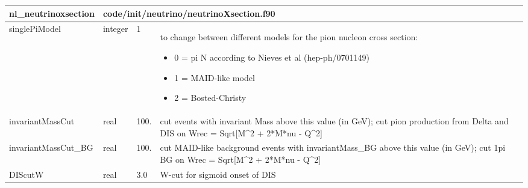\documentclass{article}
\begin{document}
\begin{longtable}{llll}
\toprule
\textbf{\large{nl\_neutrinoxsection}} & \multicolumn{3}{l}{\footnotesize{code/init/neutrino/neutrinoXsection.f90}}\\*
\midrule
\endfirsthead
\midrule
\endhead
singlePiModel & \begin{minipage}[t]{2cm}integer\end{minipage} & \begin{minipage}[t]{2cm}1\end{minipage} & \begin{minipage}[t]{12cm}to change between different models for the pion nucleon cross section:\begin{itemize}\leftmargin0em\itemindent0pt\item 0 = pi N according to Nieves et al (hep-ph/0701149)\item 1 = MAID-like model\item 2 = Bosted-Christy\end{itemize}\end{minipage}\\*
\midrule
invariantMassCut & \begin{minipage}[t]{2cm}real\end{minipage} & \begin{minipage}[t]{2cm}100.\end{minipage} & \begin{minipage}[t]{12cm}cut events with invariant Mass above this value (in GeV); cut pion production from Delta and DIS on Wrec = Sqrt[M\^{}2 + 2*M*nu - Q\^{}2]\end{minipage}\\*
\midrule
invariantMassCut\_BG & \begin{minipage}[t]{2cm}real\end{minipage} & \begin{minipage}[t]{2cm}100.\end{minipage} & \begin{minipage}[t]{12cm}cut MAID-like background events with invariantMass\_BG above this value (in GeV); cut 1pi BG on Wrec = Sqrt[M\^{}2 + 2*M*nu - Q\^{}2]\end{minipage}\\*
\midrule
DIScutW & \begin{minipage}[t]{2cm}real\end{minipage} & \begin{minipage}[t]{2cm}3.0\end{minipage} & \begin{minipage}[t]{12cm}W-cut for sigmoid onset of DIS\end{minipage}\\*

\end{longtable}
\end{document}

